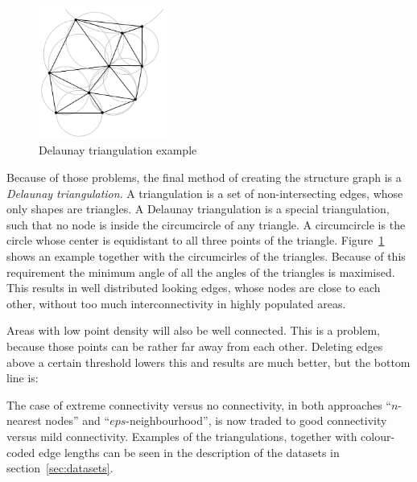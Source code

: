 \begin{figure}
	\centering
	\includegraphics[width=0.38\textwidth]{pix/Delaunay_circumcircles.png}
	\caption[Delaunay triangulation example]{Delaunay triangulation example{\protect\footnotemark}}
	\label{fig:delaunay_example}
\end{figure}
%
Because of those problems, the final method of creating the structure graph is a \emph{Delaunay triangulation}. A triangulation is a set of non-intersecting edges, whose only shapes are triangles. A Delaunay triangulation is a special triangulation, such that no node is inside the circumcircle of any triangle. A circumcircle is the circle whose center is equidistant to all three points of the triangle. Figure~\ref{fig:delaunay_example} shows an example together with the circumcirles of the triangles. Because of this requirement the minimum angle of all the angles of the triangles is maximised. This results in well distributed looking edges, whose nodes are close to each other, without too much interconnectivity in highly populated areas. 

Areas with low point density will also be well connected. This is a problem, because those points can be rather far away from each other. Deleting edges above a certain threshold lowers this and results are much better, but the bottom line is:

The case of extreme connectivity versus no connectivity, in both approaches \enquote{$n$-nearest nodes} and \enquote{$eps$-neighbourhood}, is now traded to good connectivity versus mild connectivity. Examples of the triangulations, together with colour-coded edge lengths can be seen in the description of the datasets in section~\ref{sec:datasets}.%
